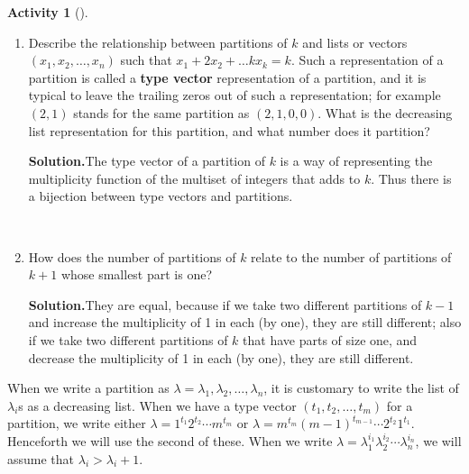 \documentclass[10pt,]{book}
\newcommand{\terminology}[1]{\textbf{#1}}
\theoremstyle{plain}
\theoremstyle{definition}
\newtheorem{activity}[project]{Activity}
\numberwithin{equation}{chapter}
\begin{document}
\begin{activity}[]\label{activity-138}
~\par
\begin{enumerate}[label=(\alph*)]
 \item Describe the relationship between partitions of \(k\) and lists or vectors \((x_1,x_2,\ldots,x_n)\) such that \(x_1+2x_2+\ldots kx_k = k\).  Such a representation of a partition is called a \terminology{type vector} representation of a partition, and it is typical to leave the trailing zeros out of such a representation; for example \((2,1)\) stands for the same partition as \((2,1,0,0)\). What is the decreasing list representation for this partition, and what number does it partition?%
\par\medskip\noindent%
\textbf{Solution.}\quad The type vector of a partition of \(k\) is a way of representing the multiplicity function of the multiset of integers that adds to \(k\). Thus there is a bijection between type vectors and partitions.%

~\par
\item How does the number of partitions of \(k\) relate to the number of partitions of \(k+1\) whose smallest part is one?%
\par\medskip\noindent%
\textbf{Solution.}\quad They are equal, because if we take two different partitions of \(k-1\) and increase the multiplicity of 1 in each (by one), they are still different; also if we take two different partitions of \(k\) that have parts of size one, and decrease the multiplicity of 1 in each (by one), they are still different.%

\end{enumerate}
\end{activity}
When we write a partition as \(\lambda = \lambda_1,\lambda_2,\ldots,\lambda_n\), it is customary to write the list of \(\lambda_i\)s as a decreasing list. When we have a type vector \((t_1,t_2,\ldots,t_m)\) for a partition, we write either \(\lambda = 1^{t_1}2^{t_2}\cdots m^{t_m}\) or \(\lambda = m^{t_m}(m-1)^{t_{m-1}}\cdots 2^{t_2}1^{t_1}\). Henceforth we will use the second of these. When we write \(\lambda=\lambda_1^{i_1}\lambda_2^{i_2}\cdots\lambda_n^{i_n}\), we will assume that \(\lambda_i>\lambda_i+1\).%
\typeout{************************************************}
\typeout{************************************************}
\end{document}
